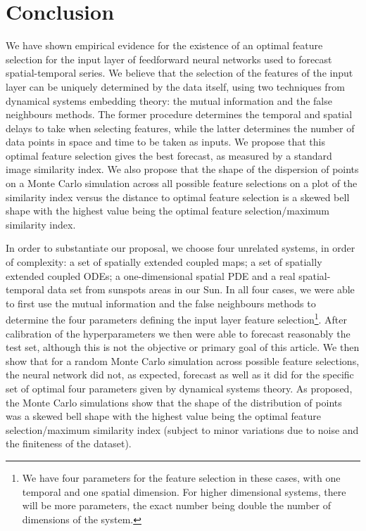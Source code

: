 \documentclass[journal]{IEEEtran}
\begin{document}




\section{Conclusion}
\label{conclusionsection}
We have shown empirical evidence for the existence of an optimal feature selection for the input layer of feedforward neural networks used to 
forecast spatial-temporal series. We believe that the selection of the features of the input layer can be uniquely determined by 
the data itself, using two techniques from dynamical systems embedding theory: the mutual information and the false neighbours 
methods. The former procedure determines the temporal and spatial delays to take when selecting features, while the latter  
determines the number of data points in space and time to be taken as inputs.  We propose that this optimal feature selection gives the best 
forecast, as measured by a standard image similarity index. We also propose that the shape of the dispersion of points on a Monte Carlo 
simulation across all possible feature selections on a plot of the similarity index versus the 
distance to optimal feature selection is a skewed bell  
shape with the highest value being the optimal feature selection/maximum similarity index.
  
In order to substantiate our proposal, we choose four unrelated systems, in order of complexity: a set of spatially 
extended coupled maps; a set of spatially extended coupled ODEs; a one-dimensional spatial PDE and a real spatial-temporal data set from 
sunspots areas in our Sun. In all four cases, we were able to first use the mutual information and the false neighbours methods to 
determine the four parameters defining the input layer feature selection\footnote{We have four parameters for the feature selection 
in these cases, with one temporal and one spatial dimension. For higher dimensional systems, there will be more parameters, the exact 
number being double the number of dimensions of the system.}. After calibration of the hyperparameters we then were able to forecast 
reasonably the test set, although this is not the objective or primary goal of this article. 
We then show that for a random Monte Carlo simulation across possible feature selections, the neural network did not, 
as expected, forecast as well as it did for the specific set of optimal four parameters given by dynamical systems theory. 
As proposed, the Monte Carlo 
simulations show that the shape of the distribution of points was a 
skewed bell shape with the highest value being the optimal feature selection/maximum similarity index (subject to minor variations due to noise
and the finiteness of the dataset).
\end{document}
